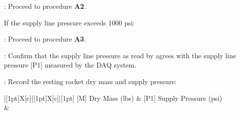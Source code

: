 \begin{checklist}
\begin{checklist}[label=$\bullet$]
        \begin{checklist}
            \item \ops{}: Proceed to procedure \textbf{A2}.
        \end{checklist}
        \item If the supply line pressure exceeds 1000 psi:
        \begin{checklist}
            \item \ops{}: Proceed to procedure \textbf{A3}.
        \end{checklist}
    \end{checklist}
    \item \control: Confirm that the supply line pressure as read by \primary{} agrees with the supply line pressure [P1] measured by the DAQ system.
    \item \ops{}: Record the resting rocket dry mass and supply pressure:

    \begin{tabu} to \textwidth { |[1pt]X[c]|[1pt]X[c]|[1pt] }
    \tabucline[1pt]{}
    [M] Dry Mass (lbs) & [P1] Supply Pressure (psi) \\
    \tabucline[1pt]{}
    \vspace{1in} & \\
    \tabucline[1pt]{}
    \end{tabu}


\end{checklist}
